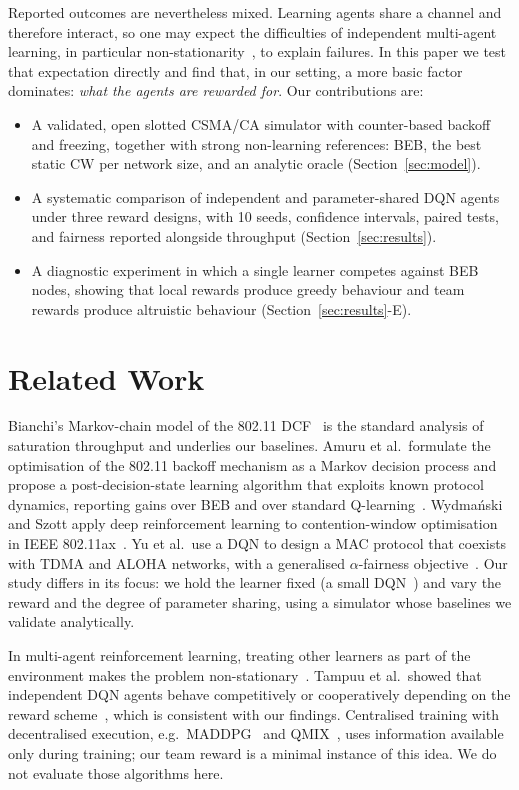 \documentclass[conference]{IEEEtran}
\begin{document}
Reported outcomes are nevertheless mixed. Learning agents share a channel and therefore interact, so one may expect the difficulties of independent multi-agent learning, in particular non-stationarity~\cite{hernandez2017}, to explain failures. In this paper we test that expectation directly and find that, in our setting, a more basic factor dominates: \emph{what the agents are rewarded for}. Our contributions are:
\begin{itemize}
\item A validated, open slotted CSMA/CA simulator with counter-based backoff and freezing, together with strong non-learning references: BEB, the best static CW per network size, and an analytic oracle (Section~\ref{sec:model}).
\item A systematic comparison of independent and parameter-shared DQN agents under three reward designs, with 10 seeds, confidence intervals, paired tests, and fairness reported alongside throughput (Section~\ref{sec:results}).
\item A diagnostic experiment in which a single learner competes against BEB nodes, showing that local rewards produce greedy behaviour and team rewards produce altruistic behaviour (Section~\ref{sec:results}-E).
\end{itemize}

\section{Related Work}
Bianchi's Markov-chain model of the 802.11 DCF~\cite{bianchi2000} is the standard analysis of saturation throughput and underlies our baselines. Amuru et al.\ formulate the optimisation of the 802.11 backoff mechanism as a Markov decision process and propose a post-decision-state learning algorithm that exploits known protocol dynamics, reporting gains over BEB and over standard Q-learning~\cite{amuru2015}. Wydma\'nski and Szott apply deep reinforcement learning to contention-window optimisation in IEEE 802.11ax~\cite{wydmanski2021}. Yu et al.\ use a DQN to design a MAC protocol that coexists with TDMA and ALOHA networks, with a generalised $\alpha$-fairness objective~\cite{yu2019}. Our study differs in its focus: we hold the learner fixed (a small DQN~\cite{mnih2015}) and vary the reward and the degree of parameter sharing, using a simulator whose baselines we validate analytically.

In multi-agent reinforcement learning, treating other learners as part of the environment makes the problem non-stationary~\cite{hernandez2017}. Tampuu et al.\ showed that independent DQN agents behave competitively or cooperatively depending on the reward scheme~\cite{tampuu2017}, which is consistent with our findings. Centralised training with decentralised execution, e.g.\ MADDPG~\cite{lowe2017} and QMIX~\cite{rashid2018}, uses information available only during training; our team reward is a minimal instance of this idea. We do not evaluate those algorithms here.
\end{document}
